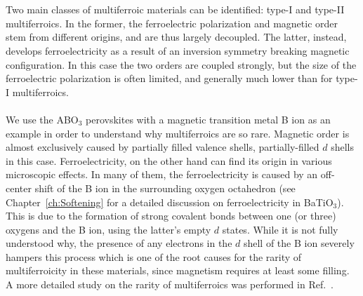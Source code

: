\\\\
Two main classes of multiferroic materials can be identified: type-I and type-II multiferroics.
In the former, the ferroelectric polarization and magnetic order stem from different origins, and are thus largely decoupled.
The latter, instead, develops ferroelectricity as a result of an inversion symmetry breaking magnetic configuration.
In this case the two orders are coupled strongly, but the size of the ferroelectric polarization is often limited, and generally much lower than for type-I multiferroics.
\\\\
We use the ABO$_3$ perovskites with a magnetic transition metal B ion as an example in order to understand why multiferroics are so rare.
Magnetic order is almost exclusively caused by partially filled valence shells, partially-filled $d$ shells in this case.
Ferroelectricity, on the other hand can find its origin in various microscopic effects.
In many of them, the ferroelectricity is caused by an off-center shift of the B ion in the surrounding oxygen octahedron (see Chapter~\ref{ch:Softening} for a detailed discussion on ferroelectricity in BaTiO$_3$).
This is due to the formation of strong covalent bonds between one (or three) oxygens and the B ion, using the latter's empty $d$ states. 
While it is not fully understood why, the presence of any electrons in the $d$ shell of the B ion severely hampers this process which is one of the root causes for the rarity of multiferroicity in these materials, since magnetism requires at least some filling.
A more detailed study on the rarity of multiferroics was performed in Ref.~\cite{Hill2000}.

